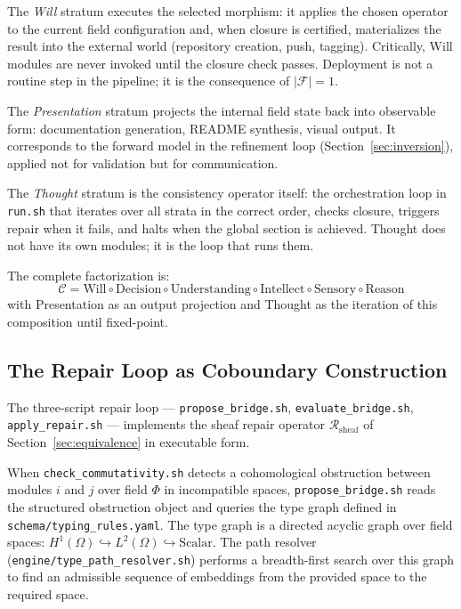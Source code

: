 \documentclass[12pt, oneside]{article}
\begin{document}
The \emph{Will} stratum executes the selected morphism: it applies the chosen operator
to the current field configuration and, when closure is certified, materializes the
result into the external world (repository creation, push, tagging). Critically, Will
modules are never invoked until the closure check passes. Deployment is not a routine
step in the pipeline; it is the consequence of $|\mathcal{F}| = 1$.

The \emph{Presentation} stratum projects the internal field state back into observable
form: documentation generation, README synthesis, visual output. It corresponds to the
forward model in the refinement loop (Section~\ref{sec:inversion}), applied not for
validation but for communication.

The \emph{Thought} stratum is the consistency operator itself: the orchestration loop
in \texttt{run.sh} that iterates over all strata in the correct order, checks closure,
triggers repair when it fails, and halts when the global section is achieved. Thought
does not have its own modules; it is the loop that runs them.

The complete factorization is:
\[
\mathcal{C} = \mathrm{Will} \circ \mathrm{Decision} \circ \mathrm{Understanding}
\circ \mathrm{Intellect} \circ \mathrm{Sensory} \circ \mathrm{Reason}
\]
with Presentation as an output projection and Thought as the iteration of this
composition until fixed-point.

\subsection{The Repair Loop as Coboundary Construction}

The three-script repair loop --- \texttt{propose\_bridge.sh},
\texttt{evaluate\_bridge.sh}, \texttt{apply\_repair.sh} --- implements the sheaf repair
operator $\mathcal{R}_{\mathrm{sheaf}}$ of Section~\ref{sec:equivalence} in executable
form.

When \texttt{check\_commutativity.sh} detects a cohomological obstruction between
modules $i$ and $j$ over field $\Phi$ in incompatible spaces, \texttt{propose\_bridge.sh}
reads the structured obstruction object and queries the type graph defined in
\texttt{schema/typing\_rules.yaml}. The type graph is a directed acyclic graph over
field spaces: $H^1(\Omega) \hookrightarrow L^2(\Omega) \hookrightarrow \mathrm{Scalar}$.
The path resolver (\texttt{engine/type\_path\_resolver.sh}) performs a breadth-first
search over this graph to find an admissible sequence of embeddings from the provided
space to the required space.
\end{document}
